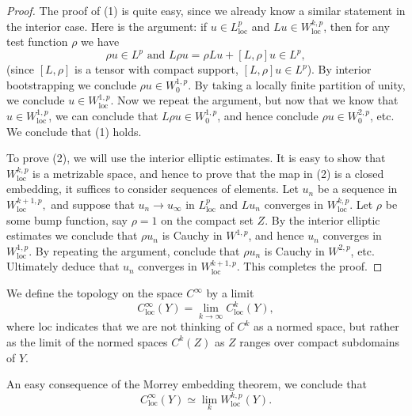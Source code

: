 \documentclass{amsart}
\begin{document}
 \begin{proof}
   The proof of (1) is quite easy, since we already know a similar
   statement in the interior case. Here is the argument: if $u\in
   L^{p}_{\text{loc}}$ and $Lu\in W^{k,p}_{\text{loc}}$, then for any
   test function $\rho$ we have
   \begin{equation*}\tag{$\ast$}
     \rho u\in L^{p}\text{ and }L\rho u=\rho Lu+[L,\rho]u\in L^{p},
   \end{equation*}
   (since $[L,\rho]$ is a tensor with compact support, $[L,\rho]u\in
   L^{p}$). By interior bootstrapping we conclude $\rho u\in
   W^{1,p}_{0}$. By taking a locally finite partition of unity, we
   conclude $u\in W^{1,p}_{\text{loc}}$. Now we repeat the argument,
   but now that we know that $u\in W^{1,p}_{\text{loc}}$, we can conclude
   that $L\rho u\in W^{1,p}_{0}$, and hence conclude $\rho u\in
   W^{2,p}_{0}$, etc. We conclude that (1) holds.

   To prove (2), we will use the interior elliptic estimates. It is
   easy to show that $W^{k,p}_{\text{loc}}$ is a metrizable space, and
   hence to prove that the map in (2) is a closed embedding, it
   suffices to consider sequences of elements. Let $u_{n}$ be a
   sequence in $W^{k+1,p}_{\text{loc}},$ and suppose that
   $u_{n}\to u_{\infty}$ in $L^{p}_{\text{loc}}$ and $Lu_{n}$
   converges in $W^{k,p}_{\text{loc}}$. Let $\rho$ be some bump
   function, say $\rho=1$ on the compact set $Z$. By the interior
   elliptic estimates we conclude that $\rho u_{n}$ is Cauchy in
   $W^{1,p}$, and hence $u_{n}$ converges in 
   $W^{1,p}_{\text{loc}}$. By repeating the argument, conclude that
   $\rho u_{n}$ is Cauchy in $W^{2,p}$, etc. Ultimately deduce that
   $u_{n}$ converges in $W^{k+1,p}_{\text{loc}}$. This completes the proof.         
 \end{proof}
 \begin{defn}
   We define the topology on the space $C^{\infty}$ by a limit 
   \begin{equation*}
     C^{\infty}_{\text{loc}}(Y)=\lim_{k\to\infty}C^{k}_{\text{loc}}(Y),
   \end{equation*}
   where $\text{loc}$ indicates that we are not thinking of $C^{k}$ as
   a normed space, but rather as the limit of the normed spaces
   $C^{k}(Z)$ as $Z$ ranges over compact subdomains of $Y$.

   An easy consequence of the Morrey embedding theorem, we conclude
   that
   \begin{equation*}\tag{$\ast$}
     C^{\infty}_{\text{loc}}(Y)\simeq \lim_{k}W^{k,p}_{\text{loc}}(Y).
   \end{equation*}
 \end{defn}
\end{document}
